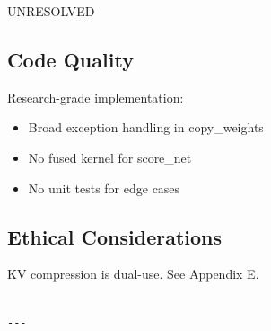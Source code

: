{{UNRESOLVED}}

\subsection{Code Quality}

Research-grade implementation:
\begin{itemize}
\item Broad exception handling in copy\_weights
\item No fused kernel for score\_net
\item No unit tests for edge cases

\end{itemize}
\subsection{Ethical Considerations}

KV compression is dual-use. See Appendix E.
\begin{lstlisting}

---
\end{lstlisting}